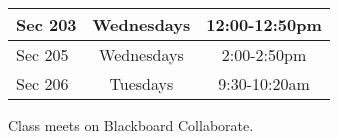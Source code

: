 
\begin{tabular}{|lcc|}\hline
Sec 203   & Wednesdays & 12:00-12:50pm \\\hline
Sec 205   & Wednesdays & 2:00-2:50pm \\\hline
Sec 206   & Tuesdays & 9:30-10:20am \\\hline
\end{tabular}

Class meets on Blackboard Collaborate.